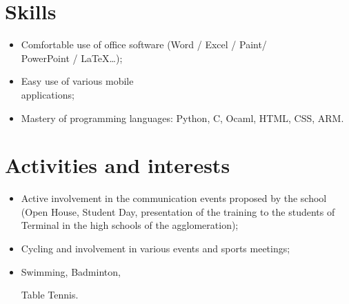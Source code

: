 \documentclass[10pt, oneside, a4paper, titlepage]{article}
\begin{document}
\begin{tcolorbox}
\begin{minipage}[t]{7cm}
\begin{spacing}{0.95}
\begin{tcolorbox}[grow to left by = 0.6cm, colback = gray!25, colframe = white]
                \section*{Skills}

                \begin{itemize}
                    \item Comfortable use of office software (Word / Excel / Paint/ \\PowerPoint / \LaTeX \ldots);

                    \item Easy use of various mobile \\applications;

                    \item Mastery of programming languages: Python, C, Ocaml, HTML, CSS, ARM. \\
                \end{itemize}



                \section*{Activities and interests}
                
                \begin{itemize}
                    \item Active involvement in the communication events proposed by the school (Open House, Student Day, presentation of the training to the students of Terminal in the high schools of the agglomeration);
                    \item Cycling and involvement in various events and sports meetings;
                    \item Swimming, Badminton, 
                    
                    Table Tennis.
                \end{itemize}

            \end{tcolorbox}
        \end{spacing}
        \end{minipage}
        \hspace*{0.4mm}
        \begin{minipage}[t]{12cm}
            \vspace*{-0.5cm}
            \begin{tcolorbox}[grow to right by = 0.6cm, colback = gray!25, colframe = white]

\end{tcolorbox}
\end{minipage}
\end{tcolorbox}
\end{document}
